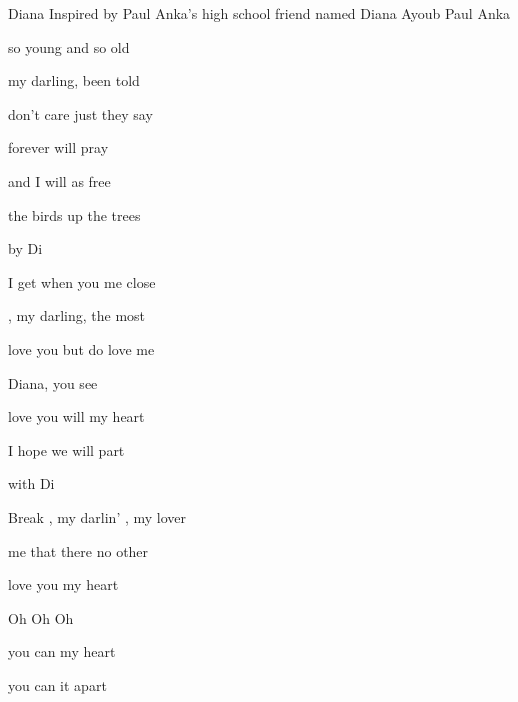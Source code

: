 \begin{SBSong}{Diana}
  {Inspired by Paul Anka's high school friend named Diana Ayoub}
  {Paul Anka}
  \begin{SBVerse}
     so young and  so old
    
     my darling,  been told
    
     don't care just  they say
    
     forever  will pray
    
     and I will  as free
    
     the birds up  the trees
    
       by  Di
    
      
  \end{SBVerse}
  \begin{SBVerse}
	 I get when you  me close
	
	, my darling,  the most
	
	 love you but do  love me
	
	 Diana,  you see
	
	 love you will  my heart
	
	 I hope we will  part
	
	   with  Di
	
	  
  \end{SBVerse}
  \begin{SBBracket}{Break}
	, my darlin' , my lover
	
	 me that there  no other
	
	 love you  my heart
	
	Oh  Oh  Oh    
  \end{SBBracket}
  \CBPageBrk
  \begin{SBVerse}
	 you can  my heart
	
	 you can  it apart
	

\end{SBVerse}
\end{SBSong}
